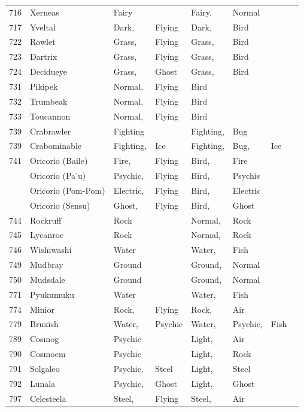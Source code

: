 \documentclass{article}
\begin{document}
\begin{longtable}{rl|ll|llll}
716 & Xerneas & Fairy &  & Fairy, & Normal &  &  \\
717 & Yveltal & Dark, & Flying & Dark, & Bird &  &  \\
\hline %
722 & Rowlet & Grass, & Flying & Grass, & Bird &  &  \\
723 & Dartrix & Grass, & Flying & Grass, & Bird &  &  \\
724 & Decidueye & Grass, & Ghost & Grass, & Bird &  &  \\
731 & Pikipek & Normal, & Flying & Bird &  &  &  \\
732 & Trumbeak & Normal, & Flying & Bird &  &  &  \\
733 & Toucannon & Normal, & Flying & Bird &  &  &  \\
739 & Crabrawler & Fighting &  & Fighting, & Bug &  &  \\
739 & Crabominable & Fighting, & Ice & Fighting, & Bug, & Ice &  \\
741 & Oricorio (Baile) & Fire, & Flying & Bird, & Fire &  &  \\
    & Oricorio (Pa'u) & Psychic, & Flying & Bird, & Psychis &  &  \\
    & Oricorio (Pom-Pom) & Electric, & Flying & Bird, & Electric &  &  \\
    & Oricorio (Sensu) & Ghost, & Flying & Bird, & Ghost &  &  \\
744 & Rockruff & Rock &  & Normal, & Rock &  &  \\
745 & Lycanroc & Rock &  & Normal, & Rock &  &  \\
746 & Wishiwashi & Water &  & Water, & Fish &  &  \\
749 & Mudbray & Ground &  & Ground, & Normal &  &  \\
750 & Mudsdale & Ground &  & Ground, & Normal &  &  \\
771 & Pyukumuku & Water &  & Water, & Fish &  &  \\
774 & Minior & Rock, & Flying & Rock, & Air &  &  \\
779 & Bruxish & Water, & Psychic & Water, & Psychic, & Fish &  \\
789 & Cosmog & Psychic &  & Light, & Air &  &  \\
790 & Cosmoem & Psychic &  & Light, & Rock &  &  \\
791 & Solgaleo & Psychic, & Steel & Light, & Steel &  &  \\
792 & Lunala & Psychic, & Ghost & Light, & Ghost &  &  \\
797 & Celesteela & Steel, & Flying & Steel, & Air &  &  \\

\end{longtable}
\end{document}
